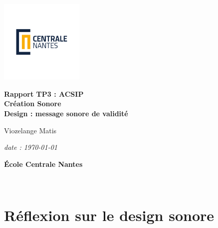 \documentclass[12pt]{report}
\begin{document}
\renewcommand{\labelenumii}{\arabic{enumi}.\arabic{enumii}}

\begin{titlepage}
    \centering
    \vspace*{0cm}
    \includegraphics[width=0.3\textwidth]{imgs/LogoCN_Q.pdf}
    
    \vspace{3cm}
    
    \Huge\textbf{Rapport TP3 : ACSIP}\\
    \vspace{1cm}
    \Large\textbf{Création Sonore}\\
    
    \vspace{2cm}
    \Large\textbf{Design : message sonore de validité}\\
    
    \vfill
    
    \Large{Viozelange Matis}\\
    \vspace{0.5cm}
    
    \vfill

    \vspace{2cm}
    
    \Large\textit{date : \today}\\
    
    \vspace{0.5cm}
    
    \Large\textbf{École Centrale Nantes}\\
    
    \vspace*{1cm}
\end{titlepage}


\newpage
\thispagestyle{empty}
~

\chapter{Réflexion sur le design sonore}
\end{document}
